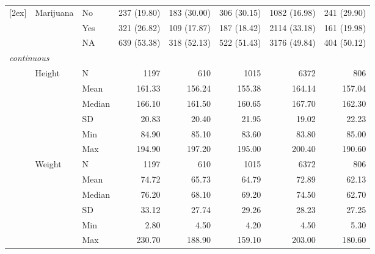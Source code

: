 \documentclass{article}
\begin{document}
\begin{longtable}{lllrrrrr}
[2ex]
 & Marijuana & No & 237  (19.80) & 183  (30.00) & 306  (30.15) & 1082 (16.98) & 241  (29.90) \\
 &  & Yes & 321  (26.82) & 109  (17.87) & 187  (18.42) & 2114 (33.18) & 161  (19.98) \\
 &  & NA & 639  (53.38) & 318  (52.13) & 522  (51.43) & 3176 (49.84) & 404  (50.12) \\
[2ex]
\multicolumn{ 7 }{l}{\textit{ continuous }}\\
& Height & N & 1197 & 610 & 1015 & 6372 & 806 \\
 &  & Mean & 161.33 & 156.24 & 155.38 & 164.14 & 157.04 \\
 &  & Median & 166.10 & 161.50 & 160.65 & 167.70 & 162.30 \\
 &  & SD & 20.83 & 20.40 & 21.95 & 19.02 & 22.23 \\
 &  & Min & 84.90 & 85.10 & 83.60 & 83.80 & 85.00 \\
 &  & Max & 194.90 & 197.20 & 195.00 & 200.40 & 190.60 \\
[2ex]
 & Weight & N & 1197 & 610 & 1015 & 6372 & 806 \\
 &  & Mean & 74.72 & 65.73 & 64.79 & 72.89 & 62.13 \\
 &  & Median & 76.20 & 68.10 & 69.20 & 74.50 & 62.70 \\
 &  & SD & 33.12 & 27.74 & 29.26 & 28.23 & 27.25 \\
 &  & Min & 2.80 & 4.50 & 4.20 & 4.50 & 5.30 \\
 &  & Max & 230.70 & 188.90 & 159.10 & 203.00 & 180.60 \\
[2ex]
\end{longtable}

\endgroup
\end{document}

